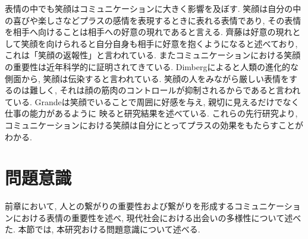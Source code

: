 表情の中でも笑顔はコミュニケーションに大きく影響を及ぼす.
笑顔は自分の中の喜びや楽しさなどプラスの感情を表現するときに表れる表情であり,
その表情を相手へ向けることは相手への好意の現れであると言える.
齊藤は好意の現れとして笑顔を向けられると自分自身も相手に好意を抱くようになると述べており,
これは「笑顔の返報性」と言われている. \cite{齊藤勇2005恋愛心理学}
またコミュニケーションにおける笑顔の重要性は近年科学的に証明されてきている.
Dimbergによると人類の進化的な側面から, 笑顔は伝染すると言われている.
笑顔の人をみながら厳しい表情をするのは難しく,
それは顔の筋肉のコントロールが抑制されるからであると言われている.\cite{dimberg2011voluntary}
Grandeは笑顔でいることで周囲に好感を与え, 親切に見えるだけでなく仕事の能力があるように
映ると研究結果を述べている.\cite{grandey2005service}
これらの先行研究より, コミュニケーションにおける笑顔は自分にとってプラスの効果をもたらすことがわかる.




\section{問題意識}
前章において, 人との繋がりの重要性および繋がりを形成するコミュニケーションにおける表情の重要性を述べ, 現代社会における出会いの多様性について述べた.
本節では, 本研究おける問題意識について述べる.

